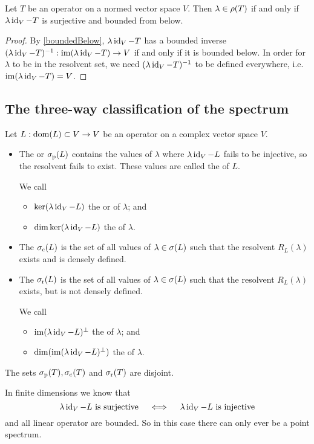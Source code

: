 \begin{lemma}
Let $T$ be an operator on a normed vector space $V$. Then $\lambda \in \rho(T)$ \textup{if and only if} $\lambda \operatorname{id}_V - T$ is surjective and bounded from below.
\end{lemma}
\begin{proof}
By \ref{boundedBelow}, $\lambda \operatorname{id}_V - T$ has a bounded inverse $(\lambda \operatorname{id}_V - T)^{-1}: \operatorname{im}(\lambda \operatorname{id}_V - T)\to V$ if and only if it is bounded below. In order for $\lambda$ to be in the resolvent set, we need $(\lambda \operatorname{id}_V - T)^{-1}$ to be defined everywhere, i.e. $\operatorname{im}(\lambda \operatorname{id}_V - T) = V$.
\end{proof}



\subsection{The three-way classification of the spectrum}
\begin{definition}
Let $L: \operatorname{dom}(L)\subset V \to V$ be an operator on a complex vector space $V$.

\begin{itemize}
\item The  or  $\sigma_\text{p}(L)$ contains the values of $\lambda$ where $\lambda \operatorname{id}_V - L$ fails to be injective, so the resolvent fails to exist. These values are called the  of $L$.

We call
\begin{itemize}
\item $\ker(\lambda \operatorname{id}_V - L)$ the  or  of $\lambda$; and
\item $\dim\ker(\lambda \operatorname{id}_V - L)$ the  of $\lambda$.
\end{itemize}
\item The  $\sigma_\text{c}(L)$ is the set of all values of $\lambda\in\sigma(L)$ such that the resolvent $R_L(\lambda)$ exists and is densely defined.
\item The  $\sigma_\text{r}(L)$ is the set of all values of $\lambda\in\sigma(L)$ such that the resolvent $R_L(\lambda)$ exists, but is not densely defined.

We call
\begin{itemize}
\item $\operatorname{im}(\lambda \operatorname{id}_V - L)^\perp$ the  of $\lambda$; and 
\item $\dim(\operatorname{im}(\lambda \operatorname{id}_V - L)^\perp)$ the  of $\lambda$.
\end{itemize}
\end{itemize}
The sets $\sigma_\text{p}(T), \sigma_\text{c}(T)$ and $\sigma_\text{r}(T)$ are disjoint.
\end{definition}
In finite dimensions we know that
\[ \text{$\lambda \operatorname{id}_V - L$ is surjective} \quad\iff\quad \text{$\lambda \operatorname{id}_V - L$ is injective} \]
and all linear operator are bounded.
So in this case there can only ever be a point spectrum.

